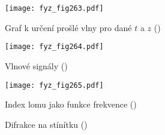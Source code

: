     \begin{figure}[ht!] %
      \centering
      \texttt{[image: fyz\_fig263.pdf]}
      \caption{Graf k určení prošlé vlny pro dané \(t\) a \(z\)
               (\cite[s.~413]{Feynman01})}
      \label{fyz:fig263}
    \end{figure}
    
    \begin{figure}[ht!] %
      \centering
      \texttt{[image: fyz\_fig264.pdf]}
      \caption{Vlnové signály
               (\cite[s.~418]{Feynman01})}
      \label{fyz:fig264}
    \end{figure}

    \begin{figure}[ht!] %
      \centering
      \texttt{[image: fyz\_fig265.pdf]}
      \caption{Index lomu jako funkce frekvence
               (\cite[s.~419]{Feynman01})}
      \label{fyz:fig265}
    \end{figure}
    

    \begin{figure}[ht!]  %
      \centering
                     \newline
                     \newline
      \caption{Difrakce na stínítku
               (\cite[s.~422]{Feynman01})}
      \label{fyz:fig266}
    \end{figure}

